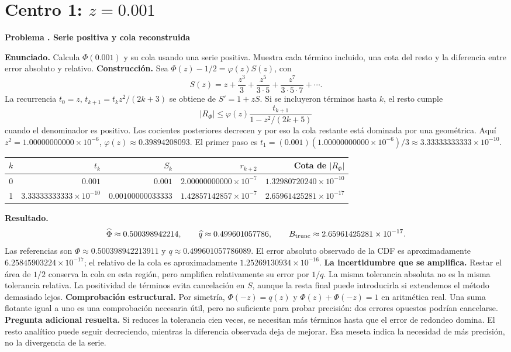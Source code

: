 \documentclass[11pt,a4paper]{article}
\theoremstyle{definition}
\newcounter{problema}
\newenvironment{resuelto}[1]{\refstepcounter{problema}\par\medskip\Needspace{6\baselineskip}\textbf{Problema \theproblema. #1}\par}{\par\medskip}
\begin{document}
\section{\texorpdfstring{Centro 1: $z=0.001$}{Centro 1: z=0.001}}
\begin{resuelto}{Serie positiva y cola reconstruida}
\textbf{Enunciado.} Calcula $\Phi(0.001)$ y su cola usando una serie positiva. Muestra cada término incluido, una cota del resto y la diferencia entre error absoluto y relativo.
\textbf{Construcción.} Sea $\Phi(z)-1/2=\varphi(z)S(z)$, con
\[
S(z)=z+\frac{z^3}{3}+\frac{z^5}{3\cdot5}+\frac{z^7}{3\cdot5\cdot7}+\cdots.
\]
La recurrencia $t_0=z$, $t_{k+1}=t_kz^2/(2k+3)$ se obtiene de $S\prime=1+zS$. Si se incluyeron términos hasta $k$, el resto cumple
\[
|R_\Phi|\le\varphi(z)\frac{t_{k+1}}{1-z^2/(2k+5)}
\]
cuando el denominador es positivo. Los cocientes posteriores decrecen y por eso la cola restante está dominada por una geométrica.
Aquí $z^2=1.00000000000\times10^{-6}$, $\varphi(z)\approx0.39894208093$. El primer paso es $t_1=(0.001)(1.00000000000\times10^{-6})/3\approx3.33333333333\times10^{-10}$.

\begin{center}\small\begin{tabular}{rrrrr}
\toprule
$k$&$t_k$&$S_k$&$r_{k+2}$&Cota de $|R_\Phi|$\\
\midrule
0&$0.001$&$0.001$&$2.00000000000\times10^{-7}$&$1.32980720240\times10^{-10}$\\
1&$3.33333333333\times10^{-10}$&$0.00100000033333$&$1.42857142857\times10^{-7}$&$2.65961425281\times10^{-17}$\\
\bottomrule\end{tabular}\end{center}
\textbf{Resultado.}
\[
\widehat\Phi\approx0.500398942214,\qquad \widehat q\approx0.499601057786,\qquad B_{\rm trunc}\approx2.65961425281\times10^{-17}.
\]
Las referencias son $\Phi\approx0.500398942213911$ y $q\approx0.499601057786089$. El error absoluto observado de la CDF es aproximadamente $6.25845903224\times10^{-17}$; el relativo de la cola es aproximadamente $1.25269130934\times10^{-16}$.
\textbf{La incertidumbre que se amplifica.} Restar el área de $1/2$ conserva la cola en esta región, pero amplifica relativamente su error por $1/q$. La misma tolerancia absoluta no es la misma tolerancia relativa. La positividad de términos evita cancelación en $S$, aunque la resta final puede introducirla si extendemos el método demasiado lejos.
\textbf{Comprobación estructural.} Por simetría, $\Phi(-z)=q(z)$ y $\Phi(z)+\Phi(-z)=1$ en aritmética real. Una suma flotante igual a uno es una comprobación necesaria útil, pero no suficiente para probar precisión: dos errores opuestos podrían cancelarse.
\textbf{Pregunta adicional resuelta.} Si reduces la tolerancia cien veces, se necesitan más términos hasta que el error de redondeo domina. El resto analítico puede seguir decreciendo, mientras la diferencia observada deja de mejorar. Esa meseta indica la necesidad de más precisión, no la divergencia de la serie.
\end{resuelto}
\end{document}
